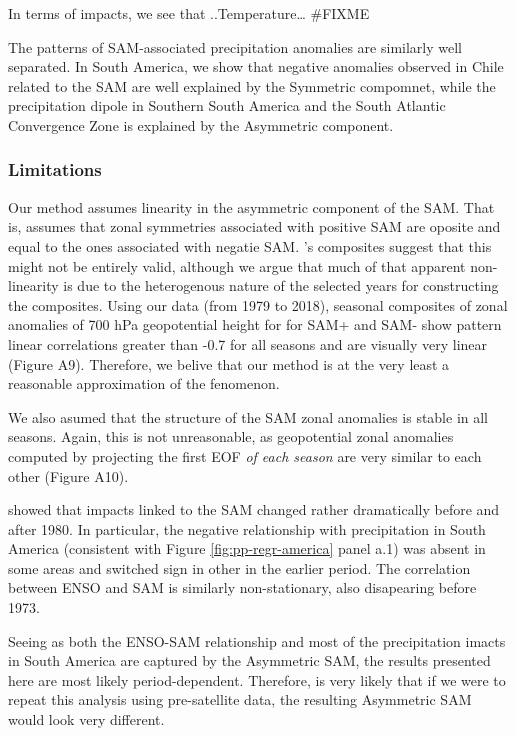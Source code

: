 \documentclass[]{ametsocV5}
\begin{document}
In terms of impacts, we see that ..Temperature\ldots{} \#FIXME

The patterns of SAM-associated precipitation anomalies are similarly
well separated. In South America, we show that negative anomalies
observed in Chile related to the SAM are well explained by the Symmetric
compomnet, while the precipitation dipole in Southern South America and
the South Atlantic Convergence Zone is explained by the Asymmetric
component.

\subsubsection{Limitations}

Our method assumes linearity in the asymmetric component of the SAM.
That is, assumes that zonal symmetries associated with positive SAM are
oposite and equal to the ones associated with negatie SAM.
\citet{fogt2012}'s composites suggest that this might not be entirely
valid, although we argue that much of that apparent non-linearity is due
to the heterogenous nature of the selected years for constructing the
composites. Using our data (from 1979 to 2018), seasonal composites of
zonal anomalies of 700 hPa geopotential height for for SAM+ and SAM-
show pattern linear correlations greater than -0.7 for all seasons and
are visually very linear (Figure A9). Therefore, we belive that our
method is at the very least a reasonable approximation of the fenomenon.

We also asumed that the structure of the SAM zonal anomalies is stable
in all seasons. Again, this is not unreasonable, as geopotential zonal
anomalies computed by projecting the first EOF \emph{of each season} are
very similar to each other (Figure A10).

\citet{silvestri2009} showed that impacts linked to the SAM changed
rather dramatically before and after 1980. In particular, the negative
relationship with precipitation in South America (consistent with Figure
\ref{fig:pp-regr-america} panel a.1) was absent in some areas and
switched sign in other in the earlier period. The correlation between
ENSO and SAM is similarly non-stationary, also disapearing before 1973.

Seeing as both the ENSO-SAM relationship and most of the precipitation
imacts in South America are captured by the Asymmetric SAM, the results
presented here are most likely period-dependent. Therefore, is very
likely that if we were to repeat this analysis using pre-satellite data,
the resulting Asymmetric SAM would look very different.
\end{document}
